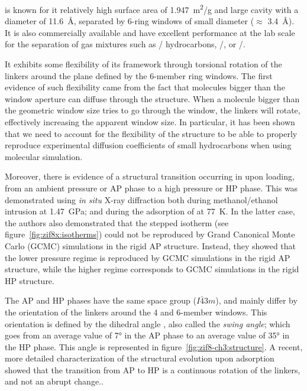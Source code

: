 \documentclass[thesis]{subfiles}
\begin{document}
 is known for it relatively high surface area of \SI{1.947}{m^2/g} and
large cavity with a diameter of \SI{11.6}{\AA}\cite{Park2006}, separated by
6-ring windows of small diameter ($\approx$ \SI{3.4}{\AA}). It is also
commercially available and have excellent performance at the lab scale for the
separation of gas mixtures such as / hydrocarbons,
/, or /\cite{Li2009, Bux2011}.

It exhibits some flexibility of its framework through torsional rotation of the
linkers around the plane defined by the 6-member ring windows. The first
evidence of such flexibility came from the fact that molecules bigger than the
window aperture can diffuse through the structure. When a molecule bigger than
the geometric window size tries to go through the window, the linkers will
rotate, effectively increasing the apparent window size. In particular, it has
been shown that we need to account for the flexibility of the structure to be
able to properly reproduce experimental diffusion coefficients of small
hydrocarbons\cite{Verploegh2015} when using molecular simulation.

Moreover, there is evidence of a structural transition occurring in  upon
loading, from an ambient pressure or AP phase to a high pressure or HP phase.
This was demonstrated using \emph{in situ} X-ray diffraction both during
methanol/ethanol intrusion at \SI{1,47}{GPa}\cite{Moggach2009}; and during the
adsorption of  at \SI{77}{K}\cite{FairenJimenez2011}. In the latter case,
the authors also demonstrated that the stepped isotherm (see
figure~\ref{fig:zif8x:isotherms}) could not be reproduced by Grand Canonical
Monte Carlo (GCMC) simulations in the rigid AP structure. Instead, they showed
that the lower pressure regime is reproduced by GCMC simulations in the rigid AP
structure, while the higher regime corresponds to GCMC simulations in the rigid
HP structure.

The AP and HP phases have the same space group ($I\bar{4}3m$), and mainly differ
by the orientation of the linkers around the 4 and 6-member windows. This
orientation is defined by the dihedral angle , also called the
\emph{swing angle}; which goes from an average value of 7° in the AP phase to an
average value of 35° in the HP phase.\cite{FairenJimenez2011} This angle is
represented in figure~\ref{fig:zif8-ch3:structure}. A recent, more detailed
characterization of the structural evolution upon adsorption showed that the
transition from AP to HP is a continuous rotation of the linkers, and not an
abrupt change.\cite{Coudert2017}.
\end{document}

